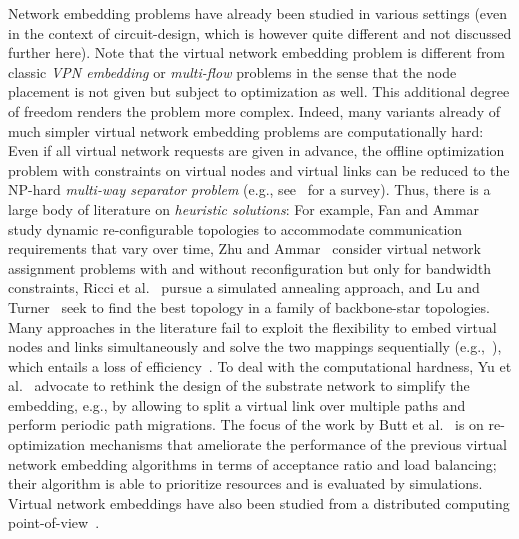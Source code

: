 \documentclass[conference,10pt]{IEEEtran}
\begin{document}
Network embedding problems have already been studied in various
settings (even in the context of circuit-design, which is however
quite different and not discussed further here). Note that the
virtual network embedding problem is different from classic
\emph{VPN embedding} or \emph{multi-flow} problems in the sense that
the node placement is not given but subject to optimization as well.
This additional degree of freedom renders the problem more complex.
Indeed, many variants already of much simpler virtual network
embedding problems are computationally hard: Even if all virtual
network requests are given in advance, the offline optimization
problem with constraints on virtual nodes and virtual links can be
reduced to the NP-hard \emph{multi-way separator problem} (e.g.,
see~\cite{nphard} for a survey). Thus, there is a large body of
literature on \emph{heuristic solutions}: For example, Fan and
Ammar~\cite{ammar} study dynamic re-configurable topologies to
accommodate communication requirements that vary over time, Zhu and
Ammar~\cite{zhu06} consider virtual network assignment problems with
and without reconfiguration but only for bandwidth constraints,
Ricci et al.~\cite{simannealing} pursue a simulated annealing
approach, and Lu and Turner~\cite{turner} seek to find the best
topology in a family of backbone-star topologies. Many approaches in
the literature fail to exploit the flexibility to embed virtual
nodes and links simultaneously and solve the two mappings
sequentially (e.g.,~\cite{pb-embed}), which entails a loss of
efficiency~\cite{isosub}. To deal with the computational hardness,
Yu et al.~\cite{rethinking} advocate to rethink the design of the
substrate network to simplify the embedding, e.g., by allowing to
split a virtual link over multiple paths and perform periodic path
migrations. The focus of the work by Butt et
al.~\cite{topoawareness} is on re-optimization mechanisms that
ameliorate the performance of the previous virtual network embedding
algorithms in terms of acceptance ratio and load balancing; their
algorithm is able to prioritize resources and is evaluated by
simulations. Virtual network embeddings have also been
studied from a distributed computing
point-of-view~\cite{distmapping}.
\end{document}
